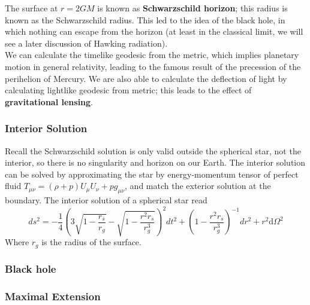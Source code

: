 \documentclass[12pt]{article}
\theoremstyle{mystyle}{\newtheorem{definition}{Definition}[subsection]}
\theoremstyle{mystyle}{\newtheorem{theorem}[definition]{Theorem}}
\theoremstyle{mystyle}{\newtheorem*{remark}{Remark}}
\theoremstyle{mystyle}{\newtheorem{example}{Example}[subsection]}
\theoremstyle{mystyle}{\newtheorem{examples}{Examples}[subsection]}
\theoremstyle{mystyle}{\newtheorem{cthm}{}[subsection]}
\begin{document}
The surface at \(r = 2GM\) is known as \textbf{Schwarzschild horizon}; this radius is known as the Schwarzschild radius.
This led to the idea of the black hole, in which nothing can escape from the horizon (at least in the classical limit, we will see a later discussion of Hawking radiation). \\
We can calculate the timelike geodesic from the metric, which implies planetary motion in general relativity, leading to the famous result of the precession of the perihelion of Mercury.
We are also able to calculate the deflection of light by calculating lightlike geodesic from metric; this leads to the effect of \textbf{gravitational lensing}.

\subsubsection{Interior Solution}

Recall the Schwarzschild solution is only valid outside the spherical star, not the interior, so there is no singularity and horizon on our Earth.
The interior solution can be solved by approximating the star by energy-momentum tensor of perfect fluid \(T_{\mu\nu} = (\rho + p)U_\mu U_\nu + pg_{\mu\nu}\),
and match the exterior solution at the boundary. The interior solution of a spherical star read \[ds^{2} =
  -\frac{1}{4} \left( 3 \sqrt{1-\frac {r_s}{r_g}}-\sqrt{1-\frac{r^2 r_s}{r_g^3}} \right)^2 dt^2 +
  \left( 1-\frac{r^2 r_s}{r_g^3} \right)^{-1} dr^2 + r^2 \mathrm{d}\Omega^2\]
Where \(r_{g}\) is the radius of the surface.

\subsubsection{Black hole}

\subsubsection{Maximal Extension}
\end{document}
